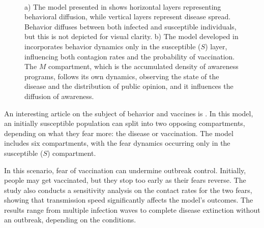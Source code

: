 \begin{figure}[h]
	\centering
	 \quad
	 \\
	\caption[Mean field models literature review]{a) The model presented in \cite{Tanaka_2002} shows horizontal layers representing behavioral diffusion, while vertical layers represent disease spread. Behavior diffuses between both infected and susceptible individuals, but this is not depicted for visual clarity. b) The model developed in \cite{Zuo2022} incorporates behavior dynamics only in the susceptible ($S$) layer, influencing both contagion rates and the probability of vaccination. The $M$ compartment, which is the accumulated density of awareness programs, follows its own dynamics, observing the state of the disease and the distribution of public opinion, and it influences the diffusion of awareness.}
	\label{fig:mean_models_1}
\end{figure}

An interesting article on the subject of behavior and vaccines is \cite{Epstein_2021}. In this model, an initially susceptible population can split into two opposing compartments, depending on what they fear more: the disease or vaccination. The model includes six compartments, with the fear dynamics occurring only in the susceptible ($S$) compartment.

In this scenario, fear of vaccination can undermine outbreak control. Initially, people may get vaccinated, but they stop too early as their fears reverse. The study also conducts a sensitivity analysis on the contact rates for the two fears, showing that transmission speed significantly affects the model’s outcomes. The results range from multiple infection waves to complete disease extinction without an outbreak, depending on the conditions.

